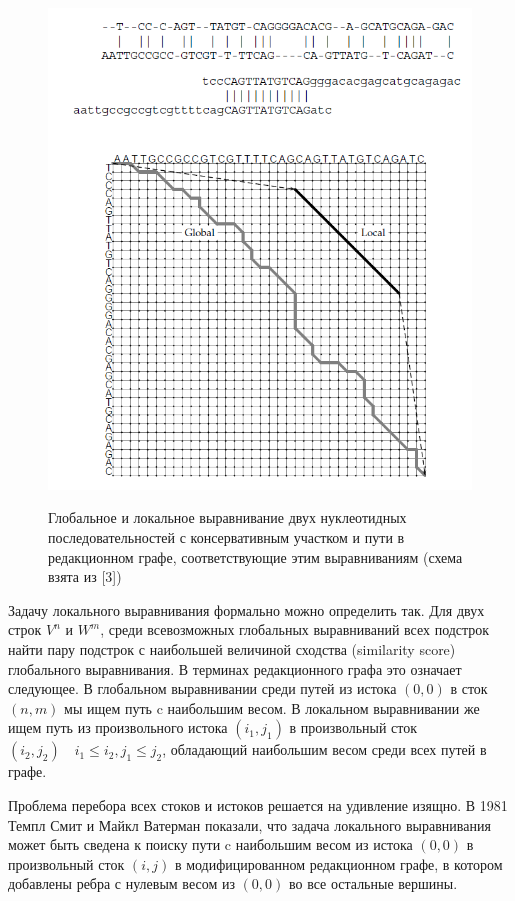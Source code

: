\documentclass[letterpaper, 11pt]{article}
\begin{document}
\begin{figure}
  \centering
  \includegraphics[width=0.7\linewidth]{images/local_and_global.png}\\
  \caption{Глобальное и локальное выравнивание двух нуклеотидных последовательностей с консервативным участком и пути в редакционном графе, соответствующие этим выравниваниям (схема взята из [3])}\label{fig:second}
\end{figure}


Задачу локального выравнивания формально можно определить так. Для двух строк $V^n$ и $W^m$, среди всевозможных глобальных выравниваний всех подстрок найти пару подстрок с наибольшей величиной сходства (similarity score) глобального выравнивания. В терминах редакционного графа это означает следующее. В глобальном выравнивании среди путей из истока $(0,0)$ в сток $(n,m)$ мы ищем путь c наибольшим весом. В локальном выравнивании же ищем путь из произвольного истока $(i_1,j_1)$ в произвольный сток $(i_2,j_2)\quad i_1\le i_2, j_1\le j_2$, обладающий наибольшим весом среди всех путей в графе.

Проблема перебора всех стоков и истоков решается на удивление изящно. В 1981 Темпл Смит и Майкл Ватерман показали, что задача локального выравнивания может быть сведена к поиску пути c наибольшим весом из истока $(0,0)$ в произвольный сток $(i,j)$ в модифицированном редакционном графе, в котором добавлены ребра с нулевым весом из $(0,0)$ во все остальные вершины.
\end{document}
